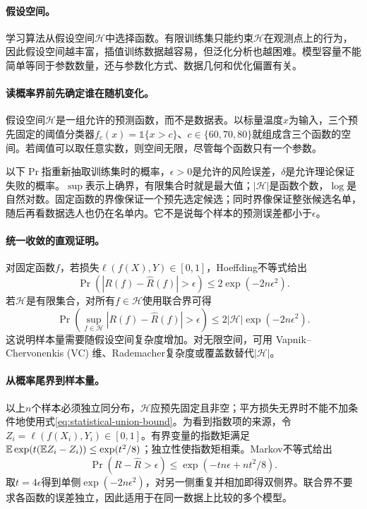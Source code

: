 \paragraph{假设空间。}
学习算法从假设空间$\mathcal{H}$中选择函数。有限训练集只能约束$\mathcal{H}$在观测点上的行为，因此假设空间越丰富，插值训练数据越容易，但泛化分析也越困难。模型容量不能简单等同于参数数量，还与参数化方式、数据几何和优化偏置有关。

\paragraph{读概率界前先确定谁在随机变化。}
假设空间$\mathcal H$是一组允许的预测函数，而不是数据表。以标量温度$x$为输入，三个预先固定的阈值分类器$f_c(x)=\mathbb 1\{x>c\}$、$c\in\{60,70,80\}$就组成含三个函数的空间。若阈值可以取任意实数，则空间无限，尽管每个函数只有一个参数。

以下$\Pr$指重新抽取训练集时的概率，$\epsilon>0$是允许的风险误差，$\delta$是允许理论保证失败的概率。$\sup$表示上确界，有限集合时就是最大值；$|\mathcal H|$是函数个数，$\log$是自然对数。固定函数的界像保证一个预先选定候选；同时界像保证整张候选名单，随后再看数据选人也仍在名单内。它不是说每个样本的预测误差都小于$\epsilon$。

\paragraph{统一收敛的直观证明。}
对固定函数$f$，若损失$\ell(f(X),Y)\in[0,1]$，Hoeffding不等式给出
\begin{equation}
 \Pr\left(|R(f)-\hat R(f)|>\epsilon\right)\leq2\exp(-2n\epsilon^2).
\end{equation}
若$\mathcal{H}$是有限集合，对所有$f\in\mathcal{H}$使用联合界可得
\begin{equation}
 \Pr\left(\sup_{f\in\mathcal{H}}|R(f)-\hat R(f)|>\epsilon\right)
 \leq2|\mathcal{H}|\exp(-2n\epsilon^2).\label{eq:statistical-union-bound}
\end{equation}
这说明样本量需要随假设空间复杂度增加。对无限空间，可用 Vapnik--Chervonenkis (VC) 维、Rademacher复杂度或覆盖数替代$|\mathcal{H}|$。

\paragraph{从概率尾界到样本量。}
以上$n$个样本必须独立同分布，$\mathcal H$应预先固定且非空；平方损失无界时不能不加条件地使用式\eqref{eq:statistical-union-bound}。为看到指数项的来源，令$Z_i=\ell(f(X_i),Y_i)\in[0,1]$。有界变量的指数矩满足$\mathbb{E}\exp(t(\mathbb{E} Z_i-Z_i))\leq\exp(t^2/8)$；独立性使指数矩相乘。Markov不等式给出
\begin{equation}
 \Pr(R-\hat R>\epsilon)
 \leq\exp(-tn\epsilon+nt^2/8).
\end{equation}
取$t=4\epsilon$得到单侧$\exp(-2n\epsilon^2)$，对另一侧重复并相加即得双侧界。联合界不要求各函数的误差独立，因此适用于在同一数据上比较的多个模型。

